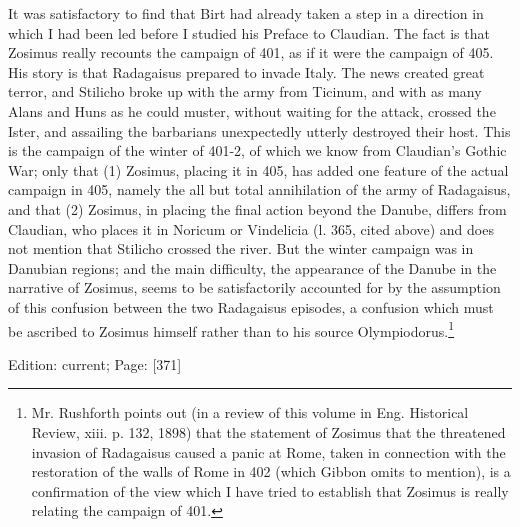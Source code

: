 It was satisfactory to find that Birt had already taken a step in a direction in which I had been led before I studied his Preface to Claudian. The fact is that Zosimus really recounts the campaign of 401, as if it were the campaign of 405. His story is that Radagaisus prepared to invade Italy. The news created great terror, and Stilicho broke up with the army from Ticinum, and with as many Alans and Huns as he could muster, without waiting for the attack, crossed the Ister, and assailing the barbarians unexpectedly utterly destroyed their host. This is the campaign of the winter of 401-2, of which we know from Claudian\texthebrew{}’s Gothic War; only that (1) Zosimus, placing it in 405, has added one feature of the actual campaign in 405, namely the all but total annihilation of the army of Radagaisus, and that (2) Zosimus, in placing the final action beyond the Danube, differs from Claudian, who places it in Noricum or Vindelicia (l. 365, cited above) and does not mention that Stilicho crossed the river. But the winter campaign was in Danubian regions; and the main difficulty, the appearance of the Danube in the narrative of Zosimus, seems to be satisfactorily accounted for by the assumption of this confusion between the two Radagaisus episodes, a confusion which must be ascribed to Zosimus himself rather than to his source Olympiodorus.\footnote{Mr. Rushforth points out (in a review of this volume in Eng. Historical Review, xiii. p. 132, 1898) that the statement of Zosimus that the threatened invasion of Radagaisus caused a panic at Rome, taken in connection with the restoration of the walls of Rome in 402 (which Gibbon omits to mention), is a confirmation of the view which I have tried to establish that Zosimus is really relating the campaign of 401.}

Edition: current; Page: [371]



